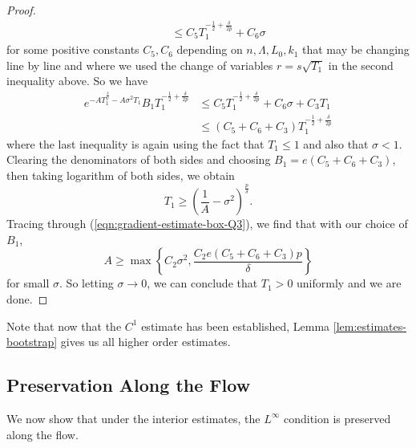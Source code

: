 \documentclass[12pt]{amsart}
\theoremstyle{plain}
\theoremstyle{plain}
\theoremstyle{definition}
\theoremstyle{remark}
\numberwithin{equation}{subsection}
\begin{document}
\begin{proof}
\begin{align*}
        &\quad\leq C_5T_1^{-\frac{1}{2}+\frac{\delta}{2p}} + C_6\sigma
    \end{align*}
    for some positive constants $C_5, C_6$ depending on $n, \Lambda, L_0, k_1$ that may be changing line by line and where we used the change of variables $r = s\sqrt{T_1}$ in the second inequality above. So we have
    \begin{align*}
        e^{-AT_1^{\frac{\delta}{p}}-A\sigma^2T_1}B_1T_1^{-\frac{1}{2}+\frac{\delta}{2p}} &\leq C_5T_1^{-\frac{1}{2}+\frac{\delta}{2p}} + C_6\sigma + C_3 T_1\nonumber \\
        &\leq (C_5 + C_6 + C_3)T_1^{-\frac{1}{2}+\frac{\delta}{2p}}
    \end{align*}
    where the last inequality is again using the fact that $T_1 \leq 1$ and also that $\sigma < 1$. Clearing the denominators of both sides and choosing $B_1 = e(C_5 + C_6 + C_3)$, then taking logarithm of both sides, we obtain
    \begin{equation*}
        T_1 \geq \left(\frac{1}{A}-\sigma^2\right)^{\frac{p}{\delta}}.
    \end{equation*}
    Tracing through (\ref{eqn:gradient-estimate-box-Q3}), we find that with our choice of $B_1$,
    \begin{equation*}
        A \geq \max\left\{ C_2\sigma^2, \frac{C_2e(C_5+C_6+C_3)p}{\delta}\right\}
    \end{equation*}
    for small $\sigma$. So letting $\sigma \to 0$, we can conclude that $T_1 > 0$ uniformly and we are done.
\end{proof}

Note that now that the $C^1$ estimate has been established, Lemma \ref{lem:estimates-bootstrap} gives us all higher order estimates.

\subsection{Preservation Along the Flow}

We now show that under the interior estimates, the $L^\infty$ condition is preserved along the flow.
\end{document}
